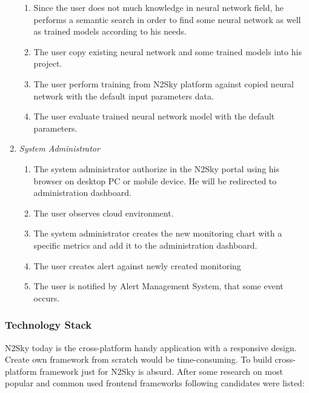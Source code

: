\begin{enumerate}
\begin{enumerate}
\item Since the user does not much knowledge in neural network field, he performs a semantic search in order to find some neural network as well as trained models according to his needs.
\item The user copy existing neural network and some trained models into his project. 
\item The user perform training from N2Sky platform against copied neural network with the default input parameters data.
\item The user evaluate trained neural network model with the default parameters. 
\end{enumerate}
\item \emph{System Administrator}
\begin{enumerate}
\item The system administrator authorize in the N2Sky portal using his browser on desktop PC or mobile device. He will be redirected to administration dashboard.
\item The user observes cloud environment.
\item The system administrator creates the new monitoring chart with a specific metrics and add it to the administration dashboard.
\item The user creates alert against newly created monitoring
\item The user is notified by Alert Management System, that some event occurs.
\end{enumerate}
\end{enumerate}


\subsubsection{Technology Stack}\label{Technology Stack}

N2Sky today is the cross-platform handy application with a responsive design. Create own framework from scratch would be time-consuming. To build cross-platform framework just for N2Sky is absurd. After some research on most popular and common used frontend frameworks following candidates were listed: 

